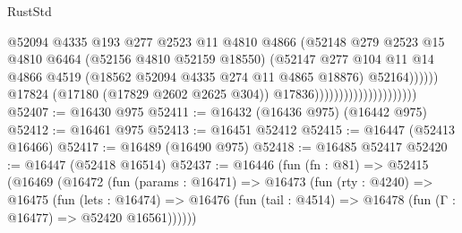 \begin{lexlean}{RustStd}
\begin{coremodule}
{\begin{coremodule}
{{{{{{{{{{{{{{{{{{{{{{{{{{{{{{{{{{{{{{{{{{{{{{{{{{{{{{{                                                      @52094
                                                      @4335
                                                      @193
                                                      @277
                                                      @2523
                                                      @11
                                                      @4810
                                                      @4866
                                                      (@52148
                                                        @279
                                                        @2523
                                                        @15
                                                        @4810
                                                        @6464
                                                        (@52156 @4810 @52159 @18550)
                                                        (@52147
                                                          @277
                                                          @104
                                                          @11
                                                          @14
                                                          @4866
                                                          @4519
                                                          (@18562
                                                            @52094
                                                            @4335
                                                            @274
                                                            @11
                                                            @4865
                                                            @18876)
                                                          @52164))))))
                                              @17824
                                              (@17180 (@17829 @2602 @2625 @304))
                                              @17836)))))))))))))))))))))
@52407 := @16430 @975
@52411 := @16432 (@16436 @975) (@16442 @975)
@52412 := @16461 @975
@52413 := @16451 @52412
@52415 := @16447 (@52413 @16466)
@52417 := @16489 (@16490 @975)
@52418 := @16485 @52417
@52420 := @16447 (@52418 @16514)
@52437 := @16446
    (fun (fn : @81) =>
    @52415
      (@16469
        (@16472
          (fun (params : @16471) =>
          @16473
            (fun (rty : @4240) =>
            @16475
              (fun (lets : @16474) =>
              @16476 (fun (tail : @4514) => @16478 (fun (Γ : @16477) => @52420 @16561))))))
}}}}}}}}}}}}}}}}}}}}}}}}}}}}}}}}}}}}}}}}}}}}}}}}}}}}}}}
\end{coremodule}}
\end{coremodule}
\end{lexlean}
